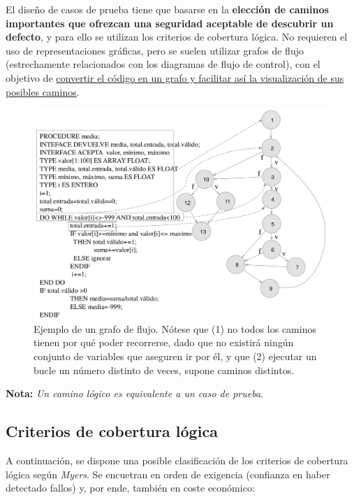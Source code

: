 El diseño de casos de prueba tiene que basarse en la \textbf{elección de caminos importantes que ofrezcan una seguridad aceptable de descubrir un defecto}, y para ello se utilizan los criterios de cobertura lógica. No requieren el uso de representaciones gráficas, pero se suelen utilizar grafos de flujo (estrechamente relacionados con los diagramas de flujo de control), con el objetivo de \uline{convertir el código en un grafo y facilitar así la visualización de sus posibles caminos}.

\begin{figure}[H]
    \centering
    \includegraphics[width=0.8\linewidth]{Resources/Tema6/Ejemplo_GrafoFlujo.png}
    \caption{Ejemplo de un grafo de flujo. Nótese que (1) no todos los caminos tienen por qué poder recorrerse, dado que no existirá ningún conjunto de variables que aseguren ir por él, y que (2) ejecutar un bucle un número distinto de veces, supone caminos distintos.}
\end{figure}

\textbf{Nota:} \textit{Un camino lógico es equivalente a un caso de prueba}.

\subsection{Criterios de cobertura lógica}

A continuación, se dispone una posible clasificación de los criterios de cobertura lógica según \textit{Myers}. Se encuetran en orden de exigencia (confianza en haber detectado fallos) y, por ende, también en coste económico:

